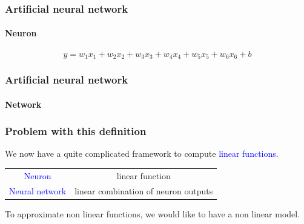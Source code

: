 \documentclass[9pt]{beamer}
\begin{document}
\begin{frame}
  \frametitle{Artificial neural network}

  \framesubtitle{Neuron}

  \begin{center}
    \scalebox{0.9}{
      
    }
  \end{center}

  \[
  y = w_{1}x_{1} + w_{2}x_{2} + w_{3}x_{3} + w_{4}x_{4} + w_{5}x_{5} + w_{6}x_{6} + b
  \]

\end{frame}

\begin{frame}
  \frametitle{Artificial neural network}

  \framesubtitle{Network}

  \begin{center}
    \scalebox{0.7}{
      
    }
  \end{center}
\end{frame}

\begin{frame}
  \frametitle{Problem with this definition}

  We now have a quite complicated framework to compute
  \textcolor{blue}{linear functions}.

  \bigskip

  \begin{center}
    \begin{tabular}{cc}
      \textcolor{blue}{Neuron} & linear function \\
      \textcolor{blue}{Neural network} & linear combination of neuron outputs \\
    \end{tabular}
  \end{center}

  \bigskip

  To approximate non linear functions, we would like to have a non
  linear model.

  \bigskip

\end{frame}
\end{document}
